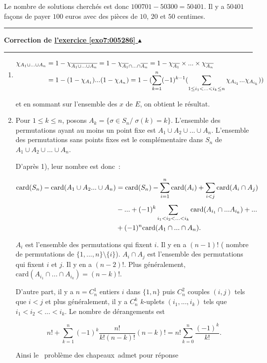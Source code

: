\documentclass[11pt,a4paper]{article}
\newcounter{exo}
\newcommand{\correction}[1]{\hypertarget{cor7:#1}{}\label{cor7:#1}{\bf Correction de \hyperlink{exo7:#1}{l'exercice \ref{exo7:#1} $\blacktriangle$}}\vspace{1mm}\hrule\vspace{1mm}}
\newcommand{\fincorrection}{\vspace{1mm}\hrule\vspace*{7mm}}
\begin{document}
Le nombre de solutions cherchés est donc $100701-50300=50401$. Il y a $50401$ façons de payer $100$ euros avec des pièces de $10$, $20$ et $50$ centimes.
\fincorrection
\correction{005286}
\begin{enumerate}
\item  
\begin{align*}\ensuremath
\chi_{A_1\cup...\cup A_n}&=1-\chi_{\overline{A_1\cup...\cup A_n}}
=1-\chi_{\overline{A_1}\cap...\cap\overline{A_n}}=1-\chi_{\overline{A_1}}\times...\times\chi_{\overline{A_n}}\\
 &=1-(1-\chi_{A_1})...(1-\chi_{A_n})=1-(\sum_{k=1}^{n}(-1)^{k-1}(\sum_{1\leq i_1<...<i_k\leq n}^{}\chi_{A_{i_1}}...\chi_{A_{i_k}}))
\end{align*}

et en sommant sur l'ensemble des $x$ de $E$, on obtient le résultat.

\item  Pour $1\leq k\leq n$, posons $A_k=\{\sigma\in S_n/\;\sigma(k)=k\}$. L'ensemble des permutations ayant au moins un point fixe est $A_1\cup A_2\cup...\cup A_n$. L'ensemble des permutations sans points fixes est le complémentaire dans $S_n$ de $A_1\cup A_2\cup...\cup A_n$.

D'après 1), leur nombre est donc~:

\begin{align*}\ensuremath
\mbox{card}(S_n)-\mbox{card}(A_1\cup A_2...\cup A_n)
&=\mbox{card}(S_n)-\sum_{i=1}^{n}\mbox{card}(A_i)+\sum_{i<j}^{}\mbox{card}(A_i\cap A_j)\\
 &-...+(-1)^{k}\sum_{i_1<i_2<...<i_k}^{}\mbox{card}(A_{i_1}\cap...A_{i_k})+...\\
 &+(-1)^{n}\mbox{card}(A_1\cap...\cap A_n).
\end{align*} 

$A_i$ est l'ensemble des permutations qui fixent $i$. Il y en a $(n-1)!$ ( nombre de permutations de $\{1,...,n\}\setminus\{i\}$). $A_i\cap A_j$ est l'ensemble des permutations qui fixent $i$ et $j$. Il y en a $(n-2)!$. Plus généralement, $\mbox{card}(A_{i_1}\cap...\cap A_{i_k})=(n-k)!$.

D'autre part, il y a $n=C_n^1$ entiers $i$ dans $\{1,n\}$ puis $C_n^2$ couples $(i,j)$ tels que $i<j$ et plus généralement, il y a $C_n^k$ $k$-uplets $(i_1,...,i_k)$ tels que $i_1<i_2< ...<i_k$. Le nombre de dérangements est  

$$n!+\sum_{k=1}^{n}(-1)^k\frac{n!}{k!(n-k)!}(n-k)!=n!\sum_{k=0}^{n}\frac{(-1)^k}{k!}.$$
 
Ainsi le \og~problème des chapeaux~\fg admet pour réponse


\end{enumerate}
\end{document}
